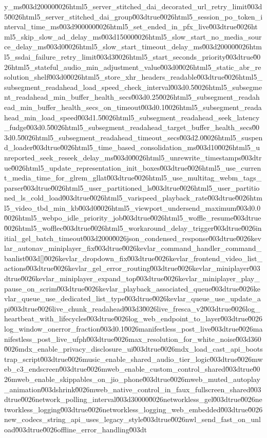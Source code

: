 {y_ms\u003d20000\u0026html5_server_stitched_dai_decorated_url_retry_limit\u003d5\u0026html5_server_stitched_dai_group\u003dtrue\u0026html5_session_po_token_interval_time_ms\u003d900000\u0026html5_set_ended_in_pfx_live\u003dtrue\u0026html5_skip_slow_ad_delay_ms\u003d15000\u0026html5_slow_start_no_media_source_delay_ms\u003d0\u0026html5_slow_start_timeout_delay_ms\u003d20000\u0026html5_ssdai_failure_retry_limit\u003d3\u0026html5_start_seconds_priority\u003dtrue\u0026html5_stateful_audio_min_adjustment_value\u003d0\u0026html5_static_abr_resolution_shelf\u003d0\u0026html5_store_xhr_headers_readable\u003dtrue\u0026html5_subsegment_readahead_load_speed_check_interval\u003d0.5\u0026html5_subsegment_readahead_min_buffer_health_secs\u003d0.25\u0026html5_subsegment_readahead_min_buffer_health_secs_on_timeout\u003d0.1\u0026html5_subsegment_readahead_min_load_speed\u003d1.5\u0026html5_subsegment_readahead_seek_latency_fudge\u003d0.5\u0026html5_subsegment_readahead_target_buffer_health_secs\u003d0.5\u0026html5_subsegment_readahead_timeout_secs\u003d2.0\u0026html5_suspend_loader\u003dtrue\u0026html5_time_based_consolidation_ms\u003d10\u0026html5_unreported_seek_reseek_delay_ms\u003d0\u0026html5_unrewrite_timestamps\u003dtrue\u0026html5_update_representation_init_boxes\u003dtrue\u0026html5_use_current_media_time_for_glrem_gllat\u003dtrue\u0026html5_use_multitag_webm_tags_parser\u003dtrue\u0026html5_user_partitioned_ls\u003dtrue\u0026html5_user_partitioned_ls_cold_load\u003dtrue\u0026html5_varispeed_playback_rate\u003dtrue\u0026html5_video_tbd_min_kb\u003d0\u0026html5_viewport_undersend_maximum\u003d0.0\u0026html5_webpo_idle_priority_job\u003dtrue\u0026html5_woffle_resume\u003dtrue\u0026html5_wofflec\u003dtrue\u0026html5_workaround_delay_trigger\u003dtrue\u0026initial_gel_batch_timeout\u003d2000\u0026json_condensed_response\u003dtrue\u0026kevlar_autonav_miniplayer_fix\u003dtrue\u0026kevlar_command_handler_command_banlist\u003d[]\u0026kevlar_dropdown_fix\u003dtrue\u0026kevlar_frontend_video_list_actions\u003dtrue\u0026kevlar_gel_error_routing\u003dtrue\u0026kevlar_miniplayer\u003dtrue\u0026kevlar_miniplayer_expand_top\u003dtrue\u0026kevlar_miniplayer_play_pause_on_scrim\u003dtrue\u0026kevlar_playback_associated_queue\u003dtrue\u0026kevlar_queue_use_dedicated_list_type\u003dtrue\u0026kevlar_queue_use_update_api\u003dtrue\u0026live_chunk_readahead\u003d3\u0026live_fresca_v2\u003dtrue\u0026log_heartbeat_with_lifecycles\u003dtrue\u0026log_web_endpoint_to_layer\u003dtrue\u0026log_window_onerror_fraction\u003d0.1\u0026manifestless_post_live\u003dtrue\u0026manifestless_post_live_ufph\u003dtrue\u0026max_resolution_for_white_noise\u003d360\u0026mdx_enable_privacy_disclosure_ui\u003dtrue\u0026mdx_load_cast_api_bootstrap_script\u003dtrue\u0026music_enable_shared_audio_tier_logic\u003dtrue\u0026mweb_c3_endscreen\u003dtrue\u0026mweb_enable_custom_control_shared\u003dtrue\u0026mweb_enable_skippables_on_jio_phone\u003dtrue\u0026mweb_muted_autoplay_animation\u003dshrink\u0026mweb_native_control_in_faux_fullscreen_shared\u003dtrue\u0026network_polling_interval\u003d30000\u0026networkless_gel\u003dtrue\u0026networkless_logging\u003dtrue\u0026networkless_logging_web_embedded\u003dtrue\u0026new_codecs_string_api_uses_legacy_style\u003dtrue\u0026nwl_send_fast_on_unload\u003dtrue\u0026offline_error_handling\u003dt}
